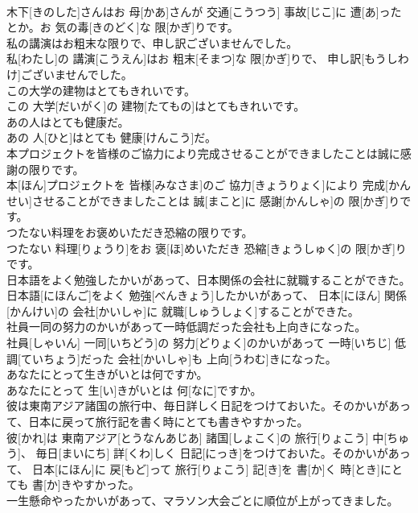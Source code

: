 \documentclass[8pt]{extreport}
\begin{document}
\begin{CJK}{UTF8}{min}
\\	木下[きのした]さんはお 母[かあ]さんが 交通[こうつう] 事故[じこ]に 遭[あ]ったとか。お 気の毒[きのどく]な 限[かぎ]りです。
\\	私の講演はお粗末な限りで、申し訳ございませんでした。	
\\	私[わたし]の 講演[こうえん]はお 粗末[そまつ]な 限[かぎ]りで、 申し訳[もうしわけ]ございませんでした。
\\	この大学の建物はとてもきれいです。	
\\	この 大学[だいがく]の 建物[たてもの]はとてもきれいです。
\\	あの人はとても健康だ。	
\\	あの 人[ひと]はとても 健康[けんこう]だ。
\\	本プロジェクトを皆様のご協力により完成させることができましたことは誠に感謝の限りです。	
\\	本[ほん]プロジェクトを 皆様[みなさま]のご 協力[きょうりょく]により 完成[かんせい]させることができましたことは 誠[まこと]に 感謝[かんしゃ]の 限[かぎ]りです。
\\	つたない料理をお褒めいただき恐縮の限りです。	
\\	つたない 料理[りょうり]をお 褒[ほ]めいただき 恐縮[きょうしゅく]の 限[かぎ]りです。
\\	日本語をよく勉強したかいがあって、日本関係の会社に就職することができた。	
\\	日本語[にほんご]をよく 勉強[べんきょう]したかいがあって、 日本[にほん] 関係[かんけい]の 会社[かいしゃ]に 就職[しゅうしょく]することができた。
\\	社員一同の努力のかいがあって一時低調だった会社も上向きになった。	
\\	社員[しゃいん] 一同[いちどう]の 努力[どりょく]のかいがあって 一時[いちじ] 低調[ていちょう]だった 会社[かいしゃ]も 上向[うわむ]きになった。
\\	あなたにとって生きがいとは何ですか。	
\\	あなたにとって 生[い]きがいとは 何[なに]ですか。
\\	彼は東南アジア諸国の旅行中、毎日詳しく日記をつけておいた。そのかいがあって、日本に戻って旅行記を書く時にとても書きやすかった。	
\\	彼[かれ]は 東南アジア[とうなんあじあ] 諸国[しょこく]の 旅行[りょこう] 中[ちゅう]、 毎日[まいにち] 詳[くわ]しく 日記[にっき]をつけておいた。そのかいがあって、 日本[にほん]に 戻[もど]って 旅行[りょこう] 記[き]を 書[か]く 時[とき]にとても 書[か]きやすかった。
\\	一生懸命やったかいがあって、マラソン大会ごとに順位が上がってきました。	

\end{CJK}
\end{document}
